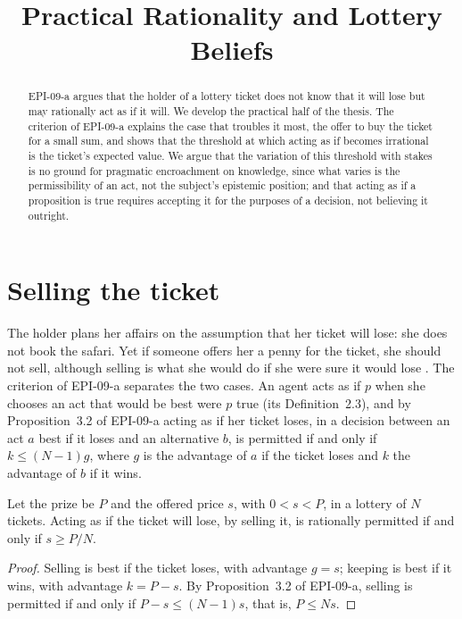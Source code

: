\documentclass{situationist-preprint}
\title{Practical Rationality and Lottery Beliefs}
\begin{document}
\maketitle

\begin{abstract}
EPI-09-a argues that the holder of a lottery ticket does not know that it will lose but may rationally act as if it will. We develop the practical half of the thesis. The criterion of EPI-09-a explains the case that troubles it most, the offer to buy the ticket for a small sum, and shows that the threshold at which acting as if becomes irrational is the ticket's expected value. We argue that the variation of this threshold with stakes is no ground for pragmatic encroachment on knowledge, since what varies is the permissibility of an act, not the subject's epistemic position; and that acting as if a proposition is true requires accepting it for the purposes of a decision, not believing it outright.
\end{abstract}

\section{Selling the ticket}

The holder plans her affairs on the assumption that her ticket will lose: she does not book the safari. Yet if someone offers her a penny for the ticket, she should not sell, although selling is what she would do if she were sure it would lose \citep{Hawthorne2004}. The criterion of EPI-09-a separates the two cases. An agent acts as if $p$ when she chooses an act that would be best were $p$ true (its Definition~2.3), and by Proposition~3.2 of EPI-09-a acting as if her ticket loses, in a decision between an act $a$ best if it loses and an alternative $b$, is permitted if and only if $k \leq (N-1)g$, where $g$ is the advantage of $a$ if the ticket loses and $k$ the advantage of $b$ if it wins.

\begin{proposition}\label{p:sell}
Let the prize be $P$ and the offered price $s$, with $0 < s < P$, in a lottery of $N$ tickets. Acting as if the ticket will lose, by selling it, is rationally permitted if and only if $s \geq P/N$.
\end{proposition}

\begin{proof}
Selling is best if the ticket loses, with advantage $g = s$; keeping is best if it wins, with advantage $k = P - s$. By Proposition~3.2 of EPI-09-a, selling is permitted if and only if $P - s \leq (N - 1)s$, that is, $P \leq Ns$.
\end{proof}
\end{document}

